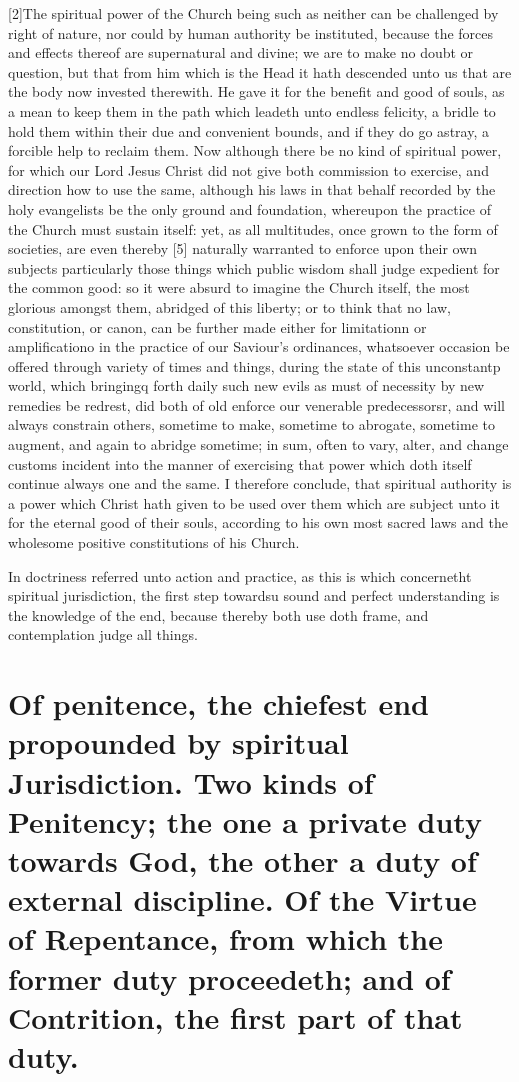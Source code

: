 [2]The spiritual power of the Church being such as neither can be challenged by right of nature, nor could by human authority be instituted, because the forces and effects thereof are supernatural and divine; we are to make no doubt or question, but that from him which is the Head it hath descended unto us that are the body now invested therewith. He gave it for the benefit and good of souls, as a mean to keep them in the path which leadeth unto endless felicity, a bridle to hold them within their due and convenient bounds, and if they do go astray, a forcible help to reclaim them. Now although there be no kind of spiritual power, for which our Lord Jesus Christ did not give both commission to exercise, and direction how to use the same, although his laws in that behalf recorded by the holy evangelists be the only ground and foundation, whereupon the practice of the Church must sustain itself: yet, as all multitudes, once grown to the form of societies, are even thereby [5] naturally warranted to enforce upon their own subjects particularly those things which public wisdom shall judge expedient for the common good: so it were absurd to imagine the Church itself, the most glorious amongst them, abridged of this liberty; or to think that no law, constitution, or canon, can be further made either for limitationn or amplificationo in the practice of our Saviour’s ordinances, whatsoever occasion be offered through variety of times and things, during the state of this unconstantp world, which bringingq forth daily such new evils as must of necessity by new remedies be redrest, did both of old enforce our venerable predecessorsr, and will always constrain others, sometime to make, sometime to abrogate, sometime to augment, and again to abridge sometime; in sum, often to vary, alter, and change customs incident into the manner of exercising that power which doth itself continue always one and the same. I therefore conclude, that spiritual authority is a power which Christ hath given to be used over them which are subject unto it for the eternal good of their souls, according to his own most sacred laws and the wholesome positive constitutions of his Church.

In doctriness referred unto action and practice, as this is which concernetht spiritual jurisdiction, the first step towardsu sound and perfect understanding is the knowledge of the end, because thereby both use doth frame, and contemplation judge all things.

\section*{Of penitence, the chiefest end propounded by spiritual Jurisdiction. Two kinds of Penitency; the one a private duty towards God, the other a duty of external discipline. Of the Virtue of Repentance, from which the former duty proceedeth; and of Contrition, the first part of that duty.}

